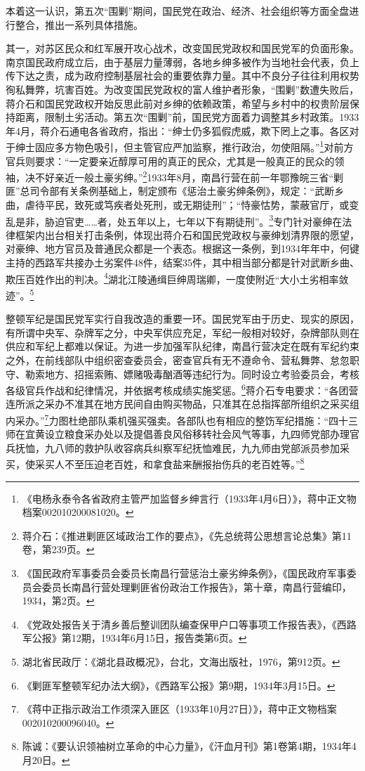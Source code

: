 本着这一认识，第五次“围剿”期间，国民党在政治、经济、社会组织等方面全盘进行整合，推出一系列具体措施。


其一，对苏区民众和红军展开攻心战术，改变国民党政权和国民党军的负面形象。南京国民政府成立后，由于基层力量薄弱，各地乡绅多被作为当地社会代表，负上传下达之责，成为政府控制基层社会的重要依靠力量。其中不良分子往往利用权势徇私舞弊，坑害百姓。为改变国民党政权的富人维护者形象，“围剿”数遭失败后，蒋介石和国民党政权开始反思此前对乡绅的依赖政策，希望与乡村中的权贵阶层保持距离，限制土劣活动。第五次“围剿”前，国民党方面着力调整其乡村政策。1933年4月，蒋介石通电各省政府，指出：“绅士仍多狐假虎威，欺下罔上之事。各区对于绅士固应多方物色吸引，但主管官应严加监察，推行政治，勿使阻隔。”\footnote{《电杨永泰令各省政府主管严加监督乡绅言行（1933年4月6日）》，蒋中正文物档案002010200081020。}对前方官兵则要求：“一定要亲近醇厚可用的真正的民众，尤其是一般真正的民众的领袖，决不好亲近一般土豪劣绅。”\footnote{蒋介石：《推进剿匪区域政治工作的要点》，《先总统蒋公思想言论总集》第11卷，第239页。}1933年8月，南昌行营在前一年鄂豫皖三省“剿匪”总司令部有关条例基础上，制定颁布《惩治土豪劣绅条例》，规定：“武断乡曲，虐待平民，致死或笃疾者处死刑，或无期徒刑”；“恃豪怙势，蒙蔽官厅，或变乱是非，胁迫官吏……者，处五年以上，七年以下有期徒刑”。\footnote{《国民政府军事委员会委员长南昌行营惩治土豪劣绅条例》，《国民政府军事委员会委员长南昌行营处理剿匪省份政治工作报告》，第十章，南昌行营编印，1934，第2页。}专门针对豪绅在法律框架内出台相关打击条例，体现出蒋介石和国民党政权与豪绅划清界限的愿望，对豪绅、地方官员及普通民众都是一个表态。根据这一条例，到1934年年中，何键主持的西路军共接办土劣案件48件，结案35件，其中相当部分都是针对武断乡曲、欺压百姓作出的判决。\footnote{《党政处报告关于清乡善后整训团队编查保甲户口等事项工作报告表》，《西路军公报》第12期，1934年6月15日，报告类第6页。}湖北江陵通缉巨绅周瑞卿，一度使附近“大小土劣相率敛迹”。\footnote{湖北省民政厅：《湖北县政概况》，台北，文海出版社，1976，第912页。}


整顿军纪是国民党军实行自我改造的重要一环。国民党军由于历史、现实的原因，有所谓中央军、杂牌军之分，中央军供应充足，军纪一般相对较好，杂牌部队则在供应和军纪上都难以保证。为进一步加强军队纪律，南昌行营决定在既有军纪约束之外，在前线部队中组织密查委员会，密查官兵有无不遵命令、营私舞弊、怠忽职守、勒索地方、招摇索贿、嫖赌吸毒酗酒等违纪行为。同时设立考验委员会，考核各级官兵作战和纪律情况，并依据考核成绩实施奖惩。\footnote{《剿匪军整顿军纪办法大纲》，《西路军公报》第9期，1934年3月15日。}蒋介石专电要求：“各团营连所派之采办不准其在地方民间自由购买物品，只准其在总指挥部所组织之采买组内采办。”\footnote{《蒋中正指示政治工作须深入匪区（1933年10月27日）》，蒋中正文物档案002010200096040。}力图杜绝部队乘机强买强卖。各部队也有相应的整饬军纪措施：“四十三师在宜黄设立粮食采办处以及提倡善良风俗移转社会风气等事，九四师党部办理官兵抚恤，九八师的救护队收容病兵纠察军纪抚恤难民，九九师由党部派员参加采买，使采买人不至压迫老百姓，和拿食盐来酬报抬伤兵的老百姓等。”\footnote{陈诚：《要认识领袖树立革命的中心力量》，《汗血月刊》第1卷第4期，1934年4月20日。}


